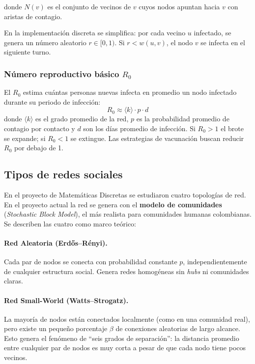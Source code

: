 \documentclass[spanish,notitlepage,letterpaper, 12pt]{article}
\begin{document}
donde $N(v)$ es el conjunto de vecinos de $v$ cuyos nodos apuntan hacia $v$ con aristas de contagio.

En la implementaci\'on discreta se simplifica: por cada vecino $u$ infectado, se genera un n\'umero aleatorio $r \in [0, 1)$. Si $r < w(u, v)$, el nodo $v$ se infecta en el siguiente turno.

\subsubsection{N\'umero reproductivo b\'asico $R_0$}

El $R_0$ estima cu\'antas personas nuevas infecta en promedio un nodo infectado durante su periodo de infecci\'on:
\begin{equation}
R_0 \approx \langle k \rangle \cdot p \cdot d
\end{equation}
donde $\langle k \rangle$ es el grado promedio de la red, $p$ es la probabilidad promedio de contagio por contacto y $d$ son los d\'ias promedio de infecci\'on. Si $R_0 > 1$ el brote se expande; si $R_0 < 1$ se extingue. Las estrategias de vacunaci\'on buscan reducir $R_0$ por debajo de 1.

\subsection{Tipos de redes sociales}

En el proyecto de Matem\'aticas Discretas se estudiaron cuatro topolog\'ias de red. En el proyecto actual la red se genera con el \textbf{modelo de comunidades} (\textit{Stochastic Block Model}), el m\'as realista para comunidades humanas colombianas. Se describen las cuatro como marco te\'orico:

\paragraph{Red Aleatoria (Erd\H{o}s--R\'enyi).} Cada par de nodos se conecta con probabilidad constante $p$, independientemente de cualquier estructura social. Genera redes homog\'eneas sin \textit{hubs} ni comunidades claras.

\paragraph{Red Small-World (Watts--Strogatz).} La mayor\'ia de nodos est\'an conectados localmente (como en una comunidad real), pero existe un peque\~no porcentaje $\beta$ de conexiones aleatorias de largo alcance. Esto genera el fen\'omeno de ``seis grados de separaci\'on'': la distancia promedio entre cualquier par de nodos es muy corta a pesar de que cada nodo tiene pocos vecinos.
\end{document}

